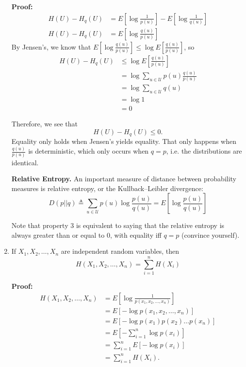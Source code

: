 \documentclass{article}
\begin{document}
\begin{enumerate}
\textbf{Proof:}
\begin{align}
       H(U) - H_q(U) &= E \left[ \log \frac{1}{p(u)} \right] - E \left[ \log \frac{1}{q(u)} \right] \\
       H(U) - H_q(U) &= E \left[ \log \frac{q(u)}{p(u)} \right]
\end{align}
By Jensen's, we know that $E \left[ \log \frac{q(u)}{p(u)} \right] \leq \log E \left[ \frac{q(u)}{p(u)} \right]$, so
 \begin{align}
           H(U) - H_q(U) &\leq \log E \left[ \frac{q(u)}{p(u)} \right] \\
           &= \log \sum\limits_{u \in \mathcal{U}} p(u) \frac{q(u)}{p(u)} \\
           &= \log \sum\limits_{u \in \mathcal{U}} q(u) \\
          &= \log 1 \\
           &= 0
           \end{align}

Therefore, we see that
 \begin{equation*}
           H(U) - H_q(U) \leq 0.
       \end{equation*}
Equality only holds when Jensen's yields equality. That only happens when $\frac{q(u)}{p(u)}$ is deterministic, which only occurs when $q = p$, i.e. the distributions are identical.

\begin{definition} \textbf{Relative Entropy.} An important measure of distance between probability measures is relative entropy, or the Kullback--Leibler divergence: 
      \begin{equation} \label{eq:relEntr}
        D(p || q) \triangleq \sum\limits_{u \in \mathcal{U}} p(u) \log \frac{p(u)}{q(u)} = E \left[ \log \frac{p(u)}{q(u)} \right]
       \end{equation}
\end{definition}

Note that property 3 is equivalent to saying that the relative entropy is always greater than or equal to $0$, with equality iff $q = p$ (convince yourself).

\item If $X_1, X_2, \ldots, X_n$ are independent random variables, then
      \begin{equation} \label{eq:prop4}
        H(X_1, X_2, \ldots, X_n) = \sum\limits_{i = 1}^{n} H(X_i)
       \end{equation}

\textbf{Proof:}
      \begin{align}
        H(X_1, X_2, \ldots, X_n) &= E \left[ \log \frac{1}{p(x_1, x_2, \ldots, x_n)} \right] \\
        &= E \left[ - \log p(x_1, x_2, \ldots, x_n) \right] \\
        &= E \left[ - \log p(x_1) p(x_2) \ldots p(x_n) \right] \\
        &= E \left[ - \sum\limits_{i = 1}^{n} \log p(x_i) \right] \\
        &= \sum\limits_{i = 1}^{n} E \left[ - \log p(x_i) \right] \\
        &= \sum\limits_{i = 1}^{n} H(X_i).
       \end{align}


\end{enumerate}
\end{document}

